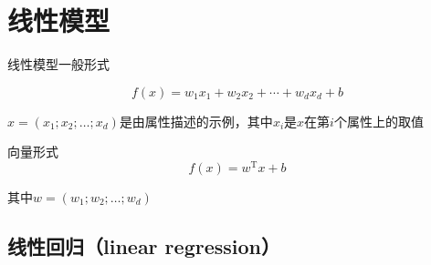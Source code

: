 \documentclass[../main.tex]{subfiles}
\begin{document}
\section{线性模型}\label{sec:linear-model}
线性模型一般形式

$$f(x)=w_{1}x_{1}+w_{2}x_{2}+\cdots+w_{d}x_{d}+b$$

$x=(x_{1};x_{2};\ldots;x_{d})$是由属性描述的示例，其中$x_{i}$是$x$在第$i$个属性上的取值

向量形式
$$
f(x)=w^{\mathrm{T}}x+b$$

其中$w=(w_{1};w_{2};\ldots;w_{d})$

\subsection{线性回归（linear regression）}\label{sec:linear-regression}
\end{document}
